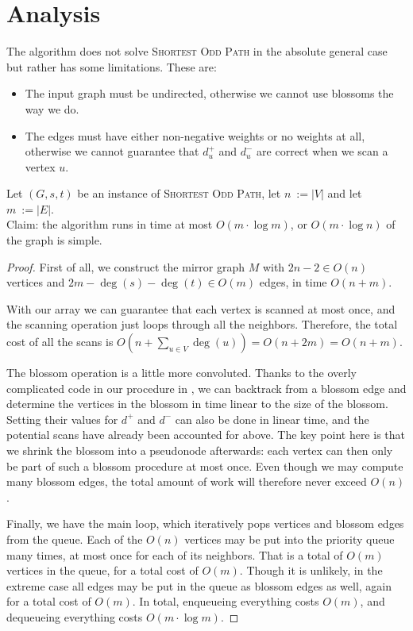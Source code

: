 \section{Analysis}
The algorithm does not solve \textsc{Shortest Odd Path} in the absolute general case but rather has some limitations. These are: 
\begin{itemize}
    \item The input graph must be undirected, otherwise we cannot use blossoms the way we do.
    \item The edges must have either non-negative weights or no weights at all, otherwise we cannot guarantee that $d^+_u$ and $d^-_u$ are correct when we scan a vertex $u$.
\end{itemize}

\begin{theorem}
    Let $(G,s,t)$ be an instance of \textsc{Shortest Odd Path}, let $n~:= |V|$ and let $m~:= |E|$. \\
    Claim: the algorithm runs in time at most $O(m \cdot \log m)$, or $O(m \cdot \log n)$ of the graph is simple.
    \begin{proof}  
        First of all, we construct the mirror graph $M$ with $2n-2 \in O(n)$ vertices and $2m - \deg(s) - \deg(t) \in O(m)$ edges, in time $O(n+m)$.
        
        With our  array we can guarantee that each vertex is scanned at most once, and the scanning operation just loops through all the neighbors. Therefore, the total cost of all the scans is $O(n + \sum_{u \in V} \deg(u)) = O(n + 2m) = O(n + m)$.
    
        The blossom operation is a little more convoluted. Thanks to the overly complicated code in our  procedure in , we can backtrack from a blossom edge and determine the vertices in the blossom in time linear to the size of the blossom. Setting their values for $d^+$ and $d^-$ can also be done in linear time, and the potential scans have already been accounted for above. The key point here is that we shrink the blossom into a pseudonode afterwards: each vertex can then only be part of such a blossom procedure at most once. Even though we may compute many blossom edges, the total amount of work will therefore never exceed $O(n)$.
    
        Finally, we have the main loop, which iteratively pops vertices and blossom edges from the queue. Each of the $O(n)$ vertices may be put into the priority queue many times, at most once for each of its neighbors. That is a total of $O(m)$ vertices in the queue, for a total cost of $O(m)$. Though it is unlikely, in the extreme case all edges may be put in the queue as blossom edges as well, again for a total cost of $O(m)$. In total, enqueueing everything costs $O(m)$, and dequeueing everything costs $O(m \cdot \log m)$.
    

\end{proof}
\end{theorem}
